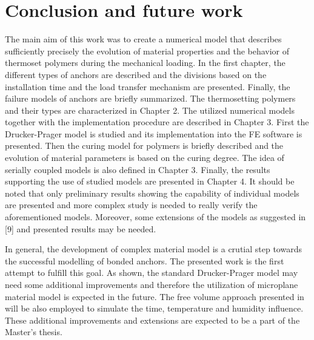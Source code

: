 \thispagestyle{plain}
\section*{Conclusion and future work}
\indent

The main aim of this work was to create a numerical model that describes sufficiently precisely the evolution of material properties and the behavior of thermoset polymers during the mechanical loading. In the first chapter, the different types of anchors are described and the divisions based on the installation time and the load transfer mechanism are presented. Finally, the failure models of anchors are briefly summarized. The thermosetting polymers and their types are characterized in Chapter 2. The utilized numerical models together with the implementation procedure are described in Chapter 3. First the Drucker-Prager model is studied and its implementation into the FE software is presented. Then the curing model for polymers is briefly described and the evolution of material parameters is based on the curing degree. The idea of serially coupled models is also defined in Chapter 3. Finally, the results supporting the use of studied models are presented in Chapter 4. It should be noted that only preliminary results showing the capability of individual models are presented and more complex study is needed to really verify the aforementioned models. Moreover, some extensions of the models as suggested in [9] and presented results may be needed. 

In general, the development of complex material model is a crutial step towards the successful modelling of bonded anchors. The presented work is the first attempt to fulfill this goal. As shown, the standard Drucker-Prager model may need some additional improvements and therefore the utilization of microplane material model \cite{di2007symmetric} is expected in the future. The free volume approach presented in \cite{popelar1997multiaxial} will be also employed to simulate the time, temperature and humidity influence. These additional improvements and extensions are expected to be a part of the Master’s thesis.
